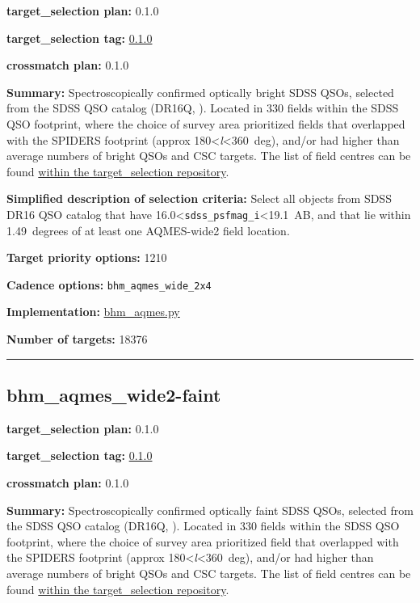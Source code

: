 \noindent\textbf{target\_selection plan:} 0.1.0

\noindent\textbf{target\_selection tag:}
\href{https://github.com/sdss/target_selection/tree/0.1.0/}{0.1.0}

\noindent\textbf{crossmatch plan:} 0.1.0

\noindent\textbf{Summary:} Spectroscopically confirmed optically bright SDSS
QSOs, selected from the SDSS QSO catalog (DR16Q,
\citealt{Lyke2020}). Located in 330 fields within the SDSS QSO footprint,
where the choice of survey area prioritized fields that overlapped with
the SPIDERS footprint (approx 180\textless{}\emph{l}\textless360~deg),
and/or had higher than average numbers of bright QSOs and CSC targets.
The list of field centres can be found
\href{https://github.com/sdss/target_selection/blob/0.1.0/python/target_selection/masks/candidate_target_fields_bhm_aqmes_wide_v0.2.1.fits}{within
the target\_selection repository}.

\noindent\textbf{Simplified description of selection criteria:} Select all
objects from SDSS DR16 QSO catalog that have
16.0\textless{}\texttt{sdss\_psfmag\_i}\textless19.1~AB, and that lie
within 1.49~degrees of at least one AQMES-wide2 field location.


\noindent\textbf{Target priority options:} 1210

\noindent\textbf{Cadence options:} \texttt{bhm\_aqmes\_wide\_2x4}

\noindent\textbf{Implementation:}
\href{https://github.com/sdss/target_selection/blob/0.1.0/python/target_selection/cartons/bhm_aqmes.py}{bhm\_aqmes.py}

\noindent\textbf{Number of targets:} 18376

\begin{center}\rule{0.5\linewidth}{0.5pt}\end{center}

\hypertarget{bhm_aqmes_wide2-faint_plan0.1.0}{%
\subsection{bhm\_aqmes\_wide2-faint}\label{bhm_aqmes_wide2-faint_plan0.1.0}}

\noindent\textbf{target\_selection plan:} 0.1.0

\noindent\textbf{target\_selection tag:}
\href{https://github.com/sdss/target_selection/tree/0.1.0/}{0.1.0}

\noindent\textbf{crossmatch plan:} 0.1.0

\noindent\textbf{Summary:} Spectroscopically confirmed optically faint SDSS QSOs,
selected from the SDSS QSO catalog (DR16Q,
\citealt{Lyke2020}). Located in 330 fields within the SDSS QSO footprint,
where the choice of survey area prioritized field that overlapped with
the SPIDERS footprint (approx 180\textless{}\emph{l}\textless360~deg),
and/or had higher than average numbers of bright QSOs and CSC targets.
The list of field centres can be found
\href{https://github.com/sdss/target_selection/blob/0.1.0/python/target_selection/masks/candidate_target_fields_bhm_aqmes_wide_v0.2.1.fits}{within
the target\_selection repository}.

